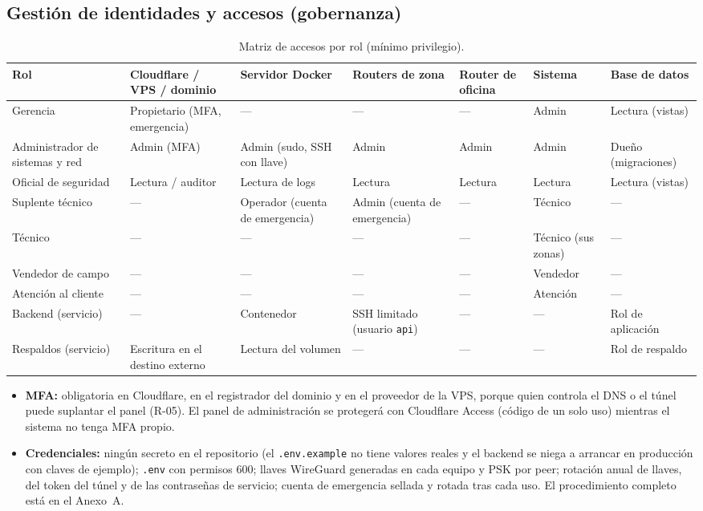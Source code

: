 \subsection{Gestión de identidades y accesos (gobernanza)}

\begin{table}[H]
\centering
\caption{Matriz de accesos por rol (mínimo privilegio).}
\label{tab:ce03-sgsi-iam}
\footnotesize
\setlength{\tabcolsep}{3pt}
\begin{tabularx}{\textwidth}{L{2.7cm}*{6}{>{\raggedright\arraybackslash}X}}
\toprule
\textbf{Rol} & \textbf{Cloudflare / VPS / dominio} & \textbf{Servidor Docker} & \textbf{Routers de zona} & \textbf{Router de oficina} & \textbf{Sistema} & \textbf{Base de datos} \\
\midrule
Gerencia & Propietario (MFA, emergencia) & --- & --- & --- & Admin & Lectura (vistas) \\
Administrador de sistemas y red & Admin (MFA) & Admin (sudo, SSH con llave) & Admin & Admin & Admin & Dueño (migraciones) \\
Oficial de seguridad & Lectura / auditor & Lectura de logs & Lectura & Lectura & Lectura & Lectura (vistas) \\
Suplente técnico & --- & Operador (cuenta de emergencia) & Admin (cuenta de emergencia) & --- & Técnico & --- \\
Técnico & --- & --- & --- & --- & Técnico (sus zonas) & --- \\
Vendedor de campo & --- & --- & --- & --- & Vendedor & --- \\
Atención al cliente & --- & --- & --- & --- & Atención & --- \\
Backend (servicio) & --- & Contenedor & SSH limitado (usuario \texttt{api}) & --- & --- & Rol de aplicación \\
Respaldos (servicio) & Escritura en el destino externo & Lectura del volumen & --- & --- & --- & Rol de respaldo \\
\bottomrule
\end{tabularx}
\end{table}

\begin{itemize}
  \item \textbf{MFA:} obligatoria en Cloudflare, en el registrador del dominio y en el
  proveedor de la VPS, porque quien controla el DNS o el túnel puede suplantar el panel
  (R-05). El panel de administración se protegerá con Cloudflare Access (código de un solo
  uso) mientras el sistema no tenga MFA propio.
  \item \textbf{Credenciales:} ningún secreto en el repositorio (el \texttt{.env.example} no
  tiene valores reales y el backend se niega a arrancar en producción con claves de
  ejemplo); \texttt{.env} con permisos 600; llaves WireGuard generadas en cada equipo y PSK
  por peer; rotación anual de llaves, del token del túnel y de las contraseñas de servicio;
  cuenta de emergencia sellada y rotada tras cada uso. El procedimiento completo está en el
  Anexo~A.
\end{itemize}

